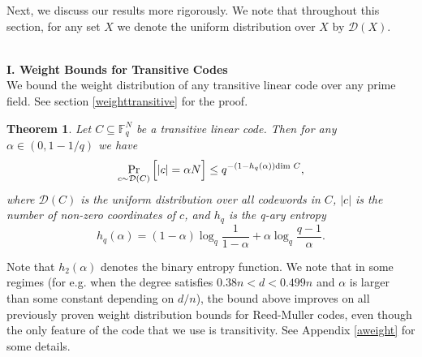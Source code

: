 \documentclass[12pt]{article}
\newtheorem{theorem}{Theorem}
\begin{document}
Next, we discuss our results more rigorously. We note that throughout this section, for any set $X$ we denote the uniform distribution over $X$ by $\mathcal{D}(X)$.

\hfill\\
\textbf{I. Weight Bounds for Transitive Codes}
\hfill\\
We bound the weight distribution of any transitive linear code over any prime field. See section \ref{weighttransitive} for the proof.
\begin{theorem}\label{probtransitive}
Let $C\subseteq \mathbb{F}_q^N$ be a transitive linear code. Then for any $\alpha\in (0,1-1/q)$ we have
$$ \Pr_{c\sim \mathcal{D}(C)}\Big[|c| = \alpha N\Big] \leq q^{-(1-h_q(\alpha)) \textnormal{dim }C},$$
where $\mathcal{D}(C)$ is the uniform distribution over all codewords in $C$, $|c|$ is the number of non-zero coordinates of $c$, and $h_q$ is the q-ary entropy $$h_q(\alpha)= (1-\alpha) \log_q \frac{1}{1-\alpha} + \alpha \log_q\frac{q-1}{\alpha}.$$
\end{theorem}
Note that $h_2(\alpha)$ denotes the binary entropy function. We note that in some regimes (for e.g. when the degree satisfies $0.38n<d<0.499n$ and  $\alpha$ is larger than some constant depending on $d/n$), the bound above improves on all previously proven weight distribution bounds for Reed-Muller codes, even though the only feature of the code that we use is transitivity. See Appendix \ref{aweight} for some details.
\end{document}
